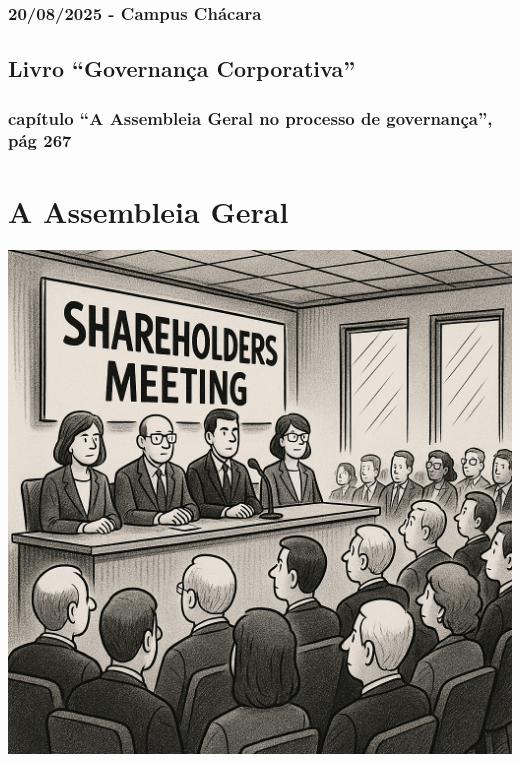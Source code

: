 \documentclass[
]{book}
\begin{document}
\subsubsection*{20/08/2025 - Campus Chácara}\label{campus-chuxe1cara-2}

\subsection{Livro ``Governança Corporativa''}\label{livro-governanuxe7a-corporativa}

\subsubsection{capítulo ``A Assembleia Geral no processo de governança'', pág 267}\label{capuxedtulo-a-assembleia-geral-no-processo-de-governanuxe7a-puxe1g-267}

\section{\texorpdfstring{\textbf{A Assembleia Geral}}{A Assembleia Geral}}\label{a-assembleia-geral}

\includegraphics[width=5.36458in,height=\textheight]{images/03-2025-08-19_20/01-assembleia_cotistas.jpg}
\end{document}
